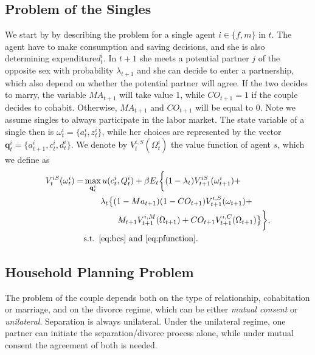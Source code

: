 \documentclass[12pt]{article}
\numberwithin{table}{section}
\begin{document}
\subsection{Problem of the Singles}
We start by by describing the problem for a single agent $i\in\{f,m\}$ in $t$. The agent have to make consumption and saving decisions, and she is also determining expenditure$d^i_t$. In $t+1$ she meets a potential partner $j$ of the opposite sex with probability $\lambda_{t+1}$ and she can decide to enter a partnership, which also depend on whether the potential partner will agree. If the two decides to marry, the variable $MA_{t+1}$ will take value 1, while $CO_{t+1}=1$ if the couple decides to cohabit. Otherwise, $MA_{t+1}$ and $CO_{t+1}$ will be equal to 0.  Note we assume singles to always participate in the labor market. The state variable of a single then is $\omega^i_t=\{a^i_t,z^i_t\}$, while her choices are represented by the vector $\mathbf{q}^i_t=\{a^i_{t+1},c^i_t,d^i_t\}$. We denote by $V_t^{i,S}(\Omega^i_t)$ the value function of agent $s$, which we define as
\begin{equation}\label{eq:v_single}
\begin{split}
V_t^{iS}(\omega^i_t)=&\max_{\mathbf{q}^i_t} u(c^i_t,Q^i_t)+\beta E_t \bigg\{(1-\lambda_t)V^{iS}_{t+1}(\omega^i_{t+1})+\\ & \quad\quad \lambda_t\big\{(1-Ma_{t+1})(1-CO_{t+1})	V^{i,S}_{t+1}(\omega_{t+1})+\\ &\quad\quad\quad\quad M_{t+1} V^{i,M}_{t+1}(\Omega_{t+1})+ CO_{t+1} V^{i,C}_{t+1}(\Omega_{t+1}) \big\}\bigg\},
\\ &\text{s.t. \eqref{eq:bcs} and \eqref{eq:pfunction}.} 
\end{split}
\end{equation}


\subsection{Household Planning Problem}
The problem of the couple depends both on the type of relationship, cohabitation or marriage, and on the divorce regime, which can be either \textit{mutual consent} or \textit{unilateral}. Separation is always unilateral. Under the unilateral regime, one partner can initiate the separation/divorce process alone, while under mutual consent the agreement of both is needed.
\end{document}
